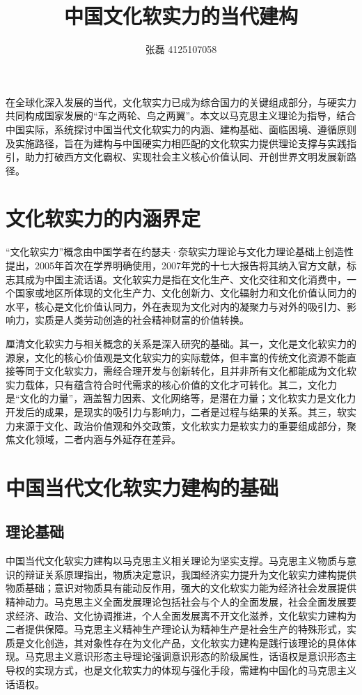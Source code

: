 \documentclass{article}
\title{中国文化软实力的当代建构}
\author{张磊 4125107058}
\date{}
\begin{document}
\maketitle


在全球化深入发展的当代，文化软实力已成为综合国力的关键组成部分，与硬实力共同构成国家发展的“车之两轮、鸟之两翼”。本文以马克思主义理论为指导，结合中国实际，系统探讨中国当代文化软实力的内涵、建构基础、面临困境、遵循原则及实施路径，旨在为建构与中国硬实力相匹配的文化软实力提供理论支撑与实践指引，助力打破西方文化霸权、实现社会主义核心价值认同、开创世界文明发展新路径。


\section{文化软实力的内涵界定}
“文化软实力”概念由中国学者在约瑟夫·奈软实力理论与文化力理论基础上创造性提出，2005年首次在学界明确使用，2007年党的十七大报告将其纳入官方文献，标志其成为中国主流话语。文化软实力是指在文化生产、文化交往和文化消费中，一个国家或地区所体现的文化生产力、文化创新力、文化辐射力和文化价值认同力的水平，核心是文化价值认同力，外在表现为文化对内的凝聚力与对外的吸引力、影响力，实质是人类劳动创造的社会精神财富的价值转换。

厘清文化软实力与相关概念的关系是深入研究的基础。其一，文化是文化软实力的源泉，文化的核心价值观是文化软实力的实际载体，但丰富的传统文化资源不能直接等同于文化软实力，需经合理开发与创新转化，且并非所有文化都能成为文化软实力载体，只有蕴含符合时代需求的核心价值的文化才可转化。其二，文化力是“文化的力量”，涵盖智力因素、文化网络等，是潜在力量；文化软实力是文化力开发后的成果，是现实的吸引力与影响力，二者是过程与结果的关系。其三，软实力来源于文化、政治价值观和外交政策，文化软实力是软实力的重要组成部分，聚焦文化领域，二者内涵与外延存在差异。

\section{中国当代文化软实力建构的基础}
\subsection{理论基础}
中国当代文化软实力建构以马克思主义相关理论为坚实支撑。马克思主义物质与意识的辩证关系原理指出，物质决定意识，我国经济实力提升为文化软实力建构提供物质基础；意识对物质具有能动反作用，强大的文化软实力能为经济社会发展提供精神动力。马克思主义全面发展理论包括社会与个人的全面发展，社会全面发展要求经济、政治、文化协调推进，个人全面发展离不开文化滋养，文化软实力建构为二者提供保障。马克思主义精神生产理论认为精神生产是社会生产的特殊形式，实质是文化创造，其对象性存在为文化产品，文化软实力建构是践行该理论的具体体现。马克思主义意识形态主导理论强调意识形态的阶级属性，话语权是意识形态主导权的实现方式，也是文化软实力的体现与强化手段，需建构中国化的马克思主义话语权。
\end{document}
